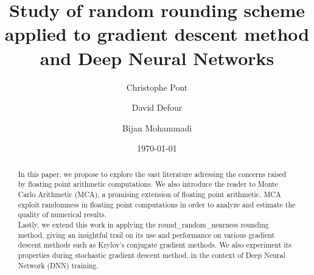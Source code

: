\documentclass[a4paper,11pt]{article}
\let\cite=\supercite
\begin{document}
\title{%
Study of random rounding scheme applied to gradient descent method and Deep Neural Networks}
\author[1]{Christophe Pont}
\author[1]{David Defour}
\author[2]{Bijan Mohammadi}
\date{\today{}} %
\setcounter{Maxaffil}{0}
\renewcommand\Affilfont{\itshape\small}

\maketitle{} %
\begin{sloppypar} \hspace{0pt} \\
  \begin{abstract}
    In this paper, we propose to explore the vast literature adressing the concerns raised by floating point arithmetic computations. We also introduce the reader to Monte Carlo Arithmetic (MCA)\cite{Parker1997}, a promising extension of floating point arithmetic. MCA exploit randomness in floating point computations in order to analyze and estimate the quality of numerical results.\\
    \indent Lastly, we extend this work in applying the {\ttfamily round\_random\_nearness} rounding method,
     giving an insightful trail on its use and performance on various gradient descent methods such as Krylov's conjugate gradient methods. 
    We also experiment its properties during stochastic gradient descent method, in the context of Deep Neural Network (DNN) training.
  \end{abstract}
\end{sloppypar}

\tableofcontents{} %
\end{document}
